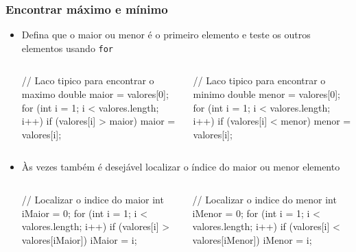 \documentclass[xcolor={dvipsnames,table},aspectratio=169]{beamer}
\begin{document}
\begin{frame}[fragile]\frametitle{Encontrar máximo e mínimo}
\begin{itemize}
	\item Defina que o maior ou menor é o primeiro elemento e teste os outros elementos usando \texttt{for}
\begin{columns}[T]
	\begin{column}{0.5\linewidth}
{\scriptsize
\begin{javacode}
// Laco tipico para encontrar o maximo
double maior = valores[0];
for (int i = 1; i < valores.length; i++)
    if  (valores[i] > maior)
        maior = valores[i];
\end{javacode}
}
	\end{column}
	\begin{column}{0.5\linewidth}
{\scriptsize
\begin{javacode}
// Laco tipico para encontrar o minimo
double menor = valores[0];
for (int i = 1; i < valores.length; i++)
    if  (valores[i] < menor)
        menor = valores[i];
\end{javacode}
}
	\end{column}
\end{columns}
	\item Às vezes também é desejável localizar o índice do maior ou menor elemento
\begin{columns}[T]
	\begin{column}{0.5\linewidth}
{\scriptsize
\begin{javacode}
// Localizar o indice do maior
int iMaior = 0;
for (int i = 1; i < valores.length; i++)
    if  (valores[i] > valores[iMaior])
        iMaior = i;
\end{javacode}
}
	\end{column}
	\begin{column}{0.5\linewidth}
{\scriptsize
\begin{javacode}
// Localizar o indice do menor
int iMenor = 0;
for (int i = 1; i < valores.length; i++)
    if  (valores[i] < valores[iMenor])
        iMenor = i;
\end{javacode}
}
	\end{column}
\end{columns}
\end{itemize}
\end{frame}
\end{document}
